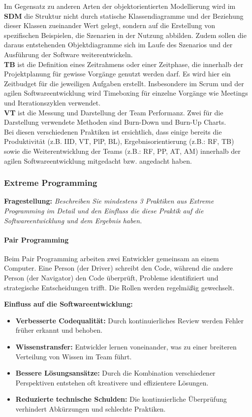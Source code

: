 Im Gegensatz zu anderen Arten der objektorientierten Modellierung wird im \textbf{SDM} die Struktur nicht durch statische Klassendiagramme und der Beziehung dieser Klassen zueinander Wert gelegt, sondern auf die Erstellung von spezifischen Beispielen, die Szenarien in der Nutzung abbilden. 
Zudem sollen die daraus entstehenden Objektdiagramme sich im Laufe des Szenarios und der Ausführung der Software weiterentwickeln.\cite{Wautelet2017-rv} \\

\textbf{TB} ist die Definition eines Zeitrahmens oder einer Zeitphase, die innerhalb der Projektplanung für gewisse Vorgänge genutzt werden darf. Es wird hier ein Zeitbudget für die jeweiligen Aufgaben erstellt. 
Insbesondere im Scrum und der agilen Softwareentwicklung wird Timeboxing für einzelne Vorgänge wie Meetings und Iterationszyklen verwendet. \cite{Miranda2011-yh} \\

\textbf{VT} ist die Messung und Darstellung der Team Performanz. Zwei für die Darstellung verwendete Methoden sind Burn-Down und Burn-Up Charts.\cite{Al-Sabbagh2018-bd} \\


Bei diesen verschiedenen Praktiken ist ersichtlich, dass einige bereits die Produktivität (z.B. IID, VT, PlP, BL), Ergebnisorientierung (z.B.: RF, TB) sowie die Weiterentwicklung der Teams (z.B.: RF, PP, AT, AM) innerhalb der agilen Softwareentwicklung mitgedacht bzw. angedacht haben.
\subsubsection{Extreme Programming}

\textbf{Fragestellung:} \textit{Beschreiben Sie mindestens 3 Praktiken aus Extreme Programming im Detail und den Einfluss
die diese Praktik auf die Softwareentwicklung und dem Ergebnis haben.}

\paragraph{Pair Programming}
Beim Pair Programming arbeiten zwei Entwickler gemeinsam an einem Computer. Eine Person (der Driver) schreibt den Code, 
während die andere Person (der Navigator) den Code überprüft, Probleme identifiziert und strategische Entscheidungen trifft. 
Die Rollen werden regelmäßig gewechselt. 

\textbf{Einfluss auf die Softwareentwicklung:}
\begin{itemize}
    \item \textbf{Verbesserte Codequalität:} Durch kontinuierliches Review werden Fehler früher erkannt und behoben.
    \item \textbf{Wissenstransfer:} Entwickler lernen voneinander, was zu einer breiteren Verteilung von Wissen im Team führt.
    \item \textbf{Bessere Lösungsansätze:} Durch die Kombination verschiedener Perspektiven entstehen oft kreativere und effizientere Lösungen.
    \item \textbf{Reduzierte technische Schulden:} Die kontinuierliche Überprüfung verhindert Abkürzungen und schlechte Praktiken.
\end{itemize}

